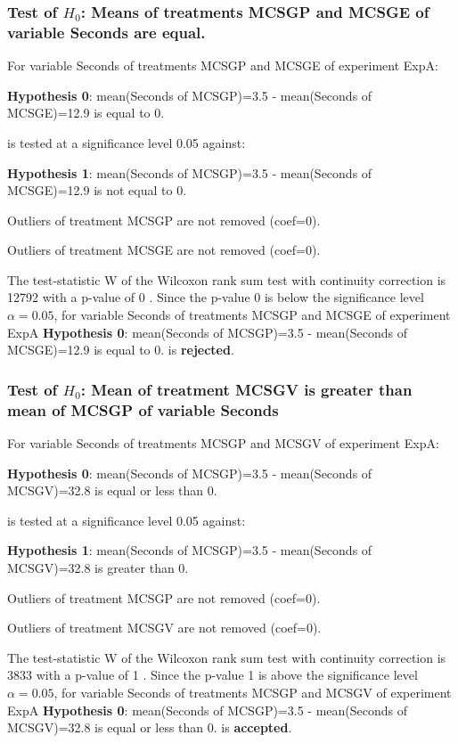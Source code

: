 \documentclass[18pt,c]{beamer}
\begin{document}
\begin{frame}[t]
 \frametitle{Test of $H_{0}$: Means of treatments MCSGP and MCSGE of variable Seconds are equal. }
 \scriptsize
 For variable Seconds of treatments MCSGP and MCSGE of experiment ExpA:

\vspace{1mm}
{\bf Hypothesis 0}: mean(Seconds of MCSGP)=3.5 - mean(Seconds of MCSGE)=12.9 is equal to 0.


 \begin{center} is tested at a significance level 0.05 against: \end{center}

{\bf Hypothesis 1}: mean(Seconds of MCSGP)=3.5 - mean(Seconds of MCSGE)=12.9 is not equal to 0.
\vspace{1mm}
\vspace{1mm}

 Outliers of treatment MCSGP  are not removed (coef=0).

 Outliers of treatment MCSGE  are not removed (coef=0).
\vspace{1mm}
 
 The test-statistic W of the Wilcoxon rank sum test with continuity correction is 12792 with a p-value of 0 .
 Since the p-value 0 is below the significance level $\alpha= 0.05 $,
 for variable Seconds of treatments MCSGP and MCSGE of experiment ExpA 
 {\bf Hypothesis 0}: mean(Seconds of MCSGP)=3.5 - mean(Seconds of MCSGE)=12.9 is equal to 0.
is {\bf rejected}.

 \end{frame}
\begin{frame}[t]
 \frametitle{Test of $H_{0}$: Mean of treatment MCSGV is greater than mean of MCSGP of variable Seconds }
 \scriptsize
 For variable Seconds of treatments MCSGP and MCSGV of experiment ExpA:

\vspace{1mm}
{\bf Hypothesis 0}: mean(Seconds of MCSGP)=3.5 - mean(Seconds of MCSGV)=32.8 is equal or less than 0.


 \begin{center} is tested at a significance level 0.05 against: \end{center}

{\bf Hypothesis 1}: mean(Seconds of MCSGP)=3.5 - mean(Seconds of MCSGV)=32.8 is greater than 0.
\vspace{1mm}
\vspace{1mm}

 Outliers of treatment MCSGP  are not removed (coef=0).

 Outliers of treatment MCSGV  are not removed (coef=0).
\vspace{1mm}
 
 The test-statistic W of the Wilcoxon rank sum test with continuity correction is 3833 with a p-value of 1 .
 Since the p-value 1 is above the significance level $\alpha= 0.05 $,
 for variable Seconds of treatments MCSGP and MCSGV of experiment ExpA 
 {\bf Hypothesis 0}: mean(Seconds of MCSGP)=3.5 - mean(Seconds of MCSGV)=32.8 is equal or less than 0.
is {\bf accepted}.

 \end{frame}
\end{document}
